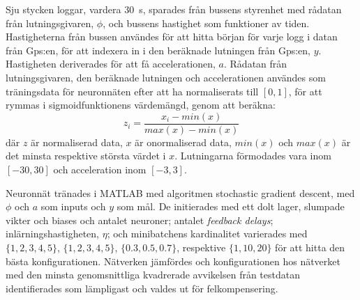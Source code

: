 Sju stycken loggar, vardera \SI{30}{\second}, sparades från bussens styrenhet
med rådatan från lutningsgivaren, $\phi$, och bussens hastighet som funktioner av tiden.
Hastigheterna från bussen användes för att hitta början för varje logg i datan från Gps:en,
för att indexera in i den beräknade lutningen från Gps:en, $y$.
Hastigheten deriverades för att få accelerationen, $a$.
Rådatan från lutningsgivaren, den beräknade lutningen
och accelerationen användes som träningsdata för neuronnäten
efter att ha normaliserats till $ \left[ 0, 1 \right] $,
för att rymmas i sigmoidfunktionens värdemängd,
genom att beräkna:
\begin{equation}
	z_i = \frac{x_i - min(x)}{max(x) - min(x)}
\end{equation}
där $z$ är normaliserad data, $x$ är onormaliserad data,
$min(x)$ och $max(x)$ är det minsta respektive största värdet i $x$.
Lutningarna förmodades vara inom $ \left[ -30, 30 \right] $
och acceleration inom $ \left[ -3, 3 \right] $.

Neuronnät tränades i MATLAB med algoritmen stochastic gradient descent,
med $\phi$ och $a$ som inputs och $y$ som mål.
De initierades med ett dolt lager, slumpade vikter och biases
och antalet neuroner; antalet \emph{feedback delays};
inlärningshastigheten, $\eta$; och minibatchens kardinalitet varierades med
$ \{ 1, 2, 3, 4, 5 \} $, $ \{ 1, 2, 3, 4, 5 \} $,
$ \{ 0.3, 0.5, 0.7 \} $, respektive $ \{ 1, 10, 20 \} $
för att hitta den bästa konfigurationen.
Nätverken jämfördes och konfigurationen hos nätverket med
den minsta genomsnittliga kvadrerade avvikelsen från testdatan
identifierades som lämpligast och valdes ut för felkompensering.
